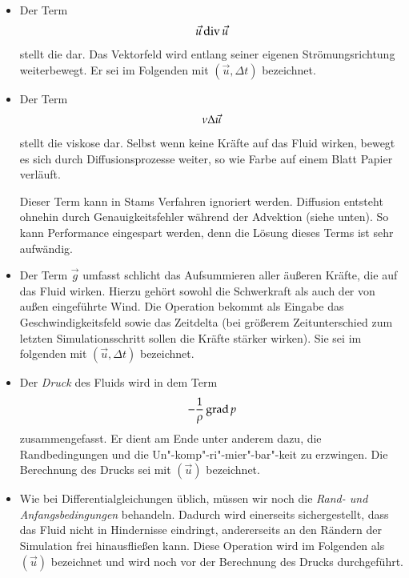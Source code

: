 \begin{itemize}
\item
	Der Term
	\begin{equation}
	\vec{u} \operatorname*{div} \vec{u}
	\end{equation}
	stellt die  dar. Das Vektorfeld wird entlang
	seiner eigenen Strömungsrichtung weiterbewegt. Er sei im Folgenden mit
	$(\vec{u},\Delta t)$ bezeichnet.
\item
	Der Term
	\begin{equation}
	\nu \Delta \vec{u}
	\end{equation}
	stellt die viskose  dar. Selbst wenn keine
	Kräfte auf das Fluid wirken, bewegt es sich durch Diffusionsprozesse
	weiter, so wie Farbe auf einem Blatt Papier verläuft.

	Dieser Term kann in Stams Verfahren ignoriert werden. Diffusion entsteht
	ohnehin  durch Genauigkeitsfehler während der
	Advektion (siehe unten). So kann Performance eingespart werden, denn die
	Lösung dieses Terms ist sehr aufwändig.
\item
	Der Term $\vec{g}$ umfasst schlicht das Aufsummieren aller äußeren
	Kräfte, die auf das Fluid wirken. Hierzu gehört sowohl die Schwerkraft
	als auch der von außen eingeführte Wind. Die Operation bekommt als
	Eingabe das Geschwindigkeitsfeld sowie das Zeitdelta (bei größerem
	Zeitunterschied zum letzten Simulationsschritt sollen die Kräfte
	stärker wirken). Sie sei im folgenden mit
	$(\vec{u},\Delta t)$ bezeichnet.
\item
	Der \emph{Druck} des Fluids wird in dem Term
	\begin{equation}
	-\frac{1}{\rho} \operatorname*{grad} p
	\end{equation}
	zusammengefasst. Er dient am Ende unter anderem dazu, die
	Randbedingungen und die Un"-komp"-ri"-mier"-bar"-keit zu erzwingen. Die Berechnung
	des Drucks sei mit $(\vec{u})$
	bezeichnet.
\item
	Wie bei Differentialgleichungen üblich, müssen wir noch die
	\emph{Rand- und Anfangsbedingungen} behandeln. Dadurch wird
	einerseits sichergestellt, dass das Fluid nicht in Hindernisse
	eindringt, andererseits an den Rändern der Simulation frei hinausfließen
	kann. Diese Operation wird im Folgenden als
	$(\vec{u})$ bezeichnet und wird noch vor der
	Berechnung des Drucks durchgeführt.
\end{itemize}

